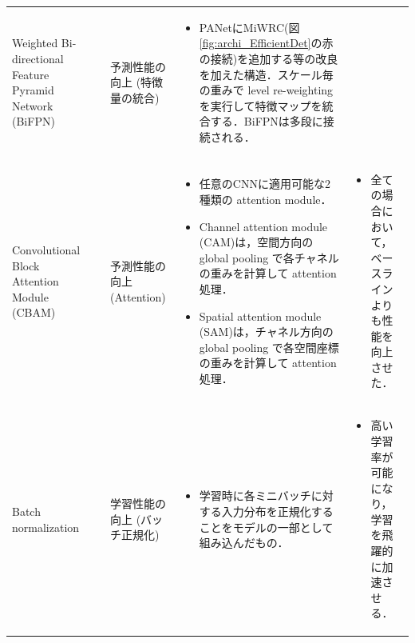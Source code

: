 \documentclass[twocolumn]{jsarticle} %
\begin{document}
\begin{table}
\begin{center}
\begin{tabularx}{\linewidth}{XcXp{7cm}X}
            Weighted Bi-directional Feature Pyramid Network (BiFPN)
            \vspace{0.7\baselineskip}
            & \cite{TPL20} & 予測性能の向上 (特徴量の統合) & 
            \begin{itemize}
                \vspace{-0.7\baselineskip}
                \setlength{\leftskip}{-3mm}
                \item PANetにMiWRC(図\ref{fig:archi_EfficientDet}の赤の接続)を追加する等の改良を加えた構造．スケール毎の重みで level re-weighting を実行して特徴マップを統合する．BiFPNは多段に接続される．
            \end{itemize}
            &
            \\

            Convolutional Block Attention Module (CBAM) 
            & \cite{WPLK18} & 予測性能の向上 (Attention) & 
            \begin{itemize}
                \vspace{-0.7\baselineskip}
                \setlength{\leftskip}{-3mm}
                \item 任意のCNNに適用可能な2種類の attention module．
                \item Channel attention module (CAM)は，空間方向の global pooling で各チャネルの重みを計算して attention 処理．
                \item Spatial attention module (SAM)は，チャネル方向の global pooling で各空間座標の重みを計算して attention 処理． 
            \end{itemize}
            &
            \begin{itemize}
                \vspace{-0.7\baselineskip}
                \setlength{\leftskip}{-3mm}
                \item 全ての場合において，ベースラインよりも性能を向上させた．
            \end{itemize}
            \\

            Batch normalization
            & \cite{IoffeSzege15} & 学習性能の向上 (バッチ正規化) & 
            \begin{itemize}
                \vspace{-0.7\baselineskip}
                \setlength{\leftskip}{-3mm}
                \item 学習時に各ミニバッチに対する入力分布を正規化することをモデルの一部として組み込んだもの．
            \end{itemize}
            &
            \begin{itemize}
                \vspace{-0.7\baselineskip}
                \setlength{\leftskip}{-3mm}
                \item 高い学習率が可能になり，学習を飛躍的に加速させる．
            \end{itemize}
            \\


\end{tabularx}
\end{center}
\end{table}
\end{document}

